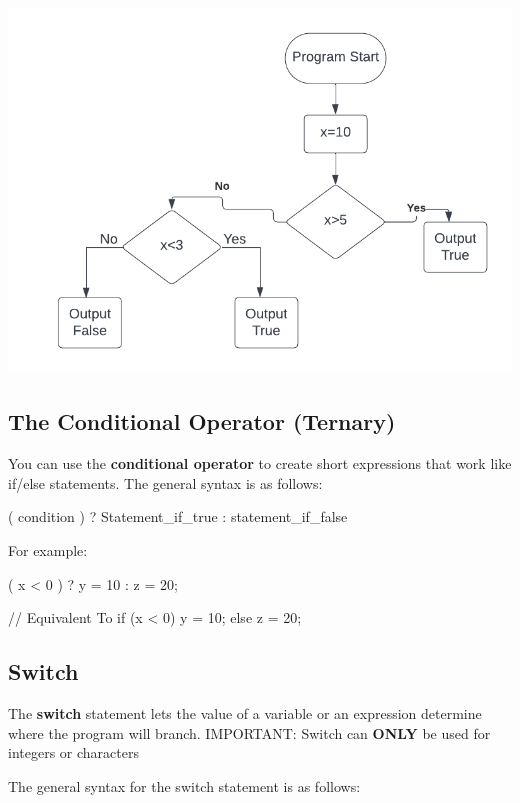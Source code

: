 \documentclass{report}
\begin{document}
    \begin{minipage}[]{0.3\textwidth}
        \begin{center}
            \includegraphics[scale=0.5]{./figures/flowchart3.png}
        \end{center} 
    \end{minipage}


    \bigbreak \noindent 
    \subsection{The Conditional Operator (Ternary)} 
    \bigbreak \noindent 
    \begin{concept}
 You can use the \textbf{conditional operator} to create short expressions that work like if/else statements. The general syntax is as follows:
	\end{concept}
    \smallbreak \noindent
    
    \begin{cppcode}
                            ( condition ) ? Statement_if_true :  statement_if_false
    \end{cppcode}
    
    \bigbreak \noindent 
    For example:
    \smallbreak \noindent
    
    \begin{cppcode}
( x < 0 ) ? y = 10 : z = 20;  

// Equivalent To
if (x < 0) {
    y = 10;
}else {
    z = 20;
}
    \end{cppcode}
    

    \pagebreak
    \subsection{Switch}
    \bigbreak \noindent 
    \begin{concept}
 The \textbf{switch} statement lets the value of a variable or an expression determine where the program will branch. IMPORTANT: Switch can \textbf{ONLY} be used for integers or characters
	\end{concept}
    \bigbreak \noindent 
    The general syntax for the switch statement is as follows:
    \bigbreak \noindent 
    
\end{document}
